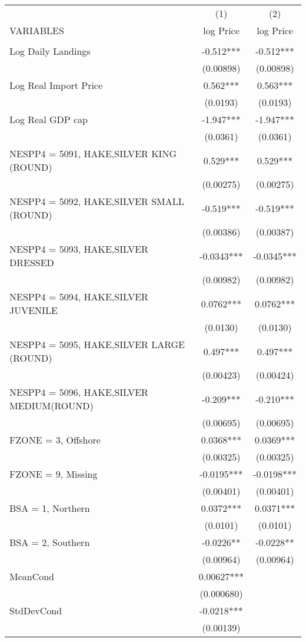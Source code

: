\begin{tabular}{lcc} \hline
 & (1) & (2) \\
VARIABLES & log Price & log Price \\ \hline
 &  &  \\
Log Daily Landings & -0.512*** & -0.512*** \\
 & (0.00898) & (0.00898) \\
Log Real Import Price & 0.562*** & 0.563*** \\
 & (0.0193) & (0.0193) \\
Log Real GDP cap & -1.947*** & -1.947*** \\
 & (0.0361) & (0.0361) \\
NESPP4 = 5091, HAKE,SILVER KING (ROUND) & 0.529*** & 0.529*** \\
 & (0.00275) & (0.00275) \\
NESPP4 = 5092, HAKE,SILVER SMALL (ROUND) & -0.519*** & -0.519*** \\
 & (0.00386) & (0.00387) \\
NESPP4 = 5093, HAKE,SILVER DRESSED & -0.0343*** & -0.0345*** \\
 & (0.00982) & (0.00982) \\
NESPP4 = 5094, HAKE,SILVER JUVENILE & 0.0762*** & 0.0762*** \\
 & (0.0130) & (0.0130) \\
NESPP4 = 5095, HAKE,SILVER LARGE (ROUND) & 0.497*** & 0.497*** \\
 & (0.00423) & (0.00424) \\
NESPP4 = 5096, HAKE,SILVER MEDIUM(ROUND) & -0.209*** & -0.210*** \\
 & (0.00695) & (0.00695) \\
FZONE = 3, Offshore & 0.0368*** & 0.0369*** \\
 & (0.00325) & (0.00325) \\
FZONE = 9, Missing & -0.0195*** & -0.0198*** \\
 & (0.00401) & (0.00401) \\
BSA = 1, Northern & 0.0372*** & 0.0371*** \\
 & (0.0101) & (0.0101) \\
BSA = 2, Southern & -0.0226** & -0.0228** \\
 & (0.00964) & (0.00964) \\
MeanCond & 0.00627*** &  \\
 & (0.000680) &  \\
StdDevCond & -0.0218*** &  \\
 & (0.00139) &  \\

\end{tabular}
